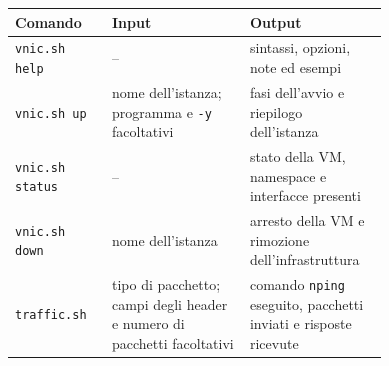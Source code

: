 \begin{tabular}{@{}l >{\raggedright\arraybackslash}p{0.37\linewidth} >{\raggedright\arraybackslash}p{0.37\linewidth}@{}}
    \toprule
    \textbf{Comando} & \textbf{Input} & \textbf{Output} \\
    \midrule
    \texttt{vnic.sh help} & -- & sintassi, opzioni, note ed esempi \\
    \texttt{vnic.sh up} & nome dell'istanza; programma e \texttt{-y} facoltativi & fasi dell'avvio e riepilogo dell'istanza \\
    \texttt{vnic.sh status} & -- & stato della VM, namespace e interfacce presenti \\
    \texttt{vnic.sh down} & nome dell'istanza & arresto della VM e rimozione dell'infrastruttura \\
    \texttt{traffic.sh} & tipo di pacchetto; campi degli header e numero di pacchetti facoltativi & comando \texttt{nping} eseguito, pacchetti inviati e risposte ricevute \\
    \bottomrule
\end{tabular}